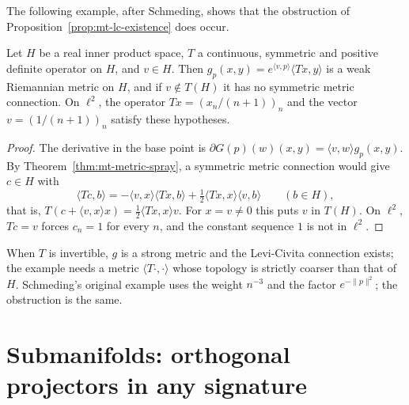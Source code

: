 The following example, after Schmeding, shows that the obstruction of
Proposition~\ref{prop:mt-lc-existence} does occur.

\begin{theorem}
  \label{thm:mt-no-levi-civita}
  \leanok
  Let $H$ be a real inner product space, $T$ a continuous, symmetric and positive definite
  operator on $H$, and $v \in H$. Then $g_p(x, y) = e^{\langle v, p\rangle} \langle Tx, y\rangle$
  is a weak Riemannian metric on $H$, and if $v \notin T(H)$ it has no symmetric metric
  connection. On $\ell^2$, the operator $Tx = (x_n / (n + 1))_n$ and the vector
  $v = (1 / (n + 1))_n$ satisfy these hypotheses.
\end{theorem}

\begin{proof}
  \leanok
  The derivative in the base point is $\partial G(p)(w)(x, y) = \langle v, w\rangle g_p(x, y)$.
  By Theorem~\ref{thm:mt-metric-spray}, a symmetric metric connection would give $c \in H$ with
  \[
    \langle Tc, b\rangle = -\langle v, x\rangle \langle Tx, b\rangle
      + \tfrac12 \langle Tx, x\rangle \langle v, b\rangle \qquad (b \in H),
  \]
  that is, $T(c + \langle v, x\rangle x) = \frac12 \langle Tx, x\rangle v$. For $x = v \neq 0$
  this puts $v$ in $T(H)$. On $\ell^2$, $Tc = v$ forces $c_n = 1$ for every $n$, and the
  constant sequence $1$ is not in $\ell^2$.
\end{proof}

When $T$ is invertible, $g$ is a strong metric and the Levi-Civita connection exists; the
example needs a metric $\langle T\cdot, \cdot\rangle$ whose topology is strictly coarser than
that of $H$. Schmeding's original example \cite[Example 4.3.7]{Sch23} uses the weight $n^{-3}$
and the factor $e^{-\|p\|^2}$; the obstruction is the same.

\section{Submanifolds: orthogonal projectors in any signature}
\label{sec:mt-projector-metric}

